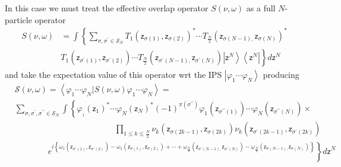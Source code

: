\documentclass[aps,preprint]{revtex4}%
\begin{document}
In this case we must treat the effective overlap operator $S\left(  \nu
,\omega\right)  $ as a full $N$-particle operator
\begin{align}
S\left(  \nu,\omega\right)   &  =\int\left\{
{\textstyle\sum\limits_{\sigma,\sigma^{\prime}\in\mathcal{S}_{N}}}
T_{1}\left(  \mathsf{z}_{\sigma\left(  1\right)  },\mathsf{z}_{\sigma\left(
2\right)  }\right)  ^{\ast}\cdots T_{\frac{N}{2}}\left(  \mathsf{z}%
_{\sigma\left(  N-1\right)  ,}\mathsf{z}_{\sigma\left(  N\right)  }\right)
^{\ast}\right. \nonumber\\
&  \left.  T_{1}\left(  \mathsf{z}_{\sigma^{\prime}\left(  1\right)
},\mathsf{z}_{\sigma^{\prime}\left(  2\right)  }\right)  \cdots T_{\frac{N}%
{2}}\left(  \mathsf{z}_{\sigma^{\prime}\left(  N-1\right)  ,}\mathsf{z}%
_{\sigma^{\prime}\left(  N\right)  }\right)  \left\vert \mathsf{z}%
^{N}\right\rangle \left\langle \mathsf{z}^{N}\right\vert \right\}
d\mathsf{z}^{N}%
\end{align}
and take the expectation value of this operator wrt the IPS $\left\vert
\varphi_{1}\cdots\varphi_{N}\right\rangle $ producing
\begin{align}
&  \mathcal{S}\left(  \nu,\omega\right)  =\left\langle \varphi_{1}%
\cdots\varphi_{N}|S\left(  \nu,\omega\right)  \varphi_{1}\cdots\varphi
_{N}\right\rangle =\nonumber\\
&
{\textstyle\sum\limits_{\sigma,\sigma^{\prime},\sigma^{\prime\prime}%
\in\mathcal{S}_{N}}}
{\displaystyle\int}
\left\{  \varphi_{_{1}}\left(  \mathsf{z}_{1}\right)  ^{\ast}\cdots\varphi
_{N}\left(  \mathsf{z}_{N}\right)  ^{\ast}\left(  -1\right)  ^{\pi\left(
\sigma^{\prime\prime}\right)  }\varphi_{1}\left(  \mathsf{z}_{\sigma
^{\prime\prime}\left(  1\right)  }\right)  \cdots\varphi_{N}\left(
\mathsf{z}_{\sigma^{\prime\prime}\left(  N\right)  }\right)  \right.
\times\nonumber\\
&  \qquad\qquad\qquad\qquad\qquad\qquad%
{\displaystyle\prod\limits_{1\leq k\leq\frac{N}{2}}}
\nu_{k}\left(  \mathsf{z}_{\sigma\left(  2k-1\right)  },\mathsf{z}%
_{\sigma\left(  2k\right)  }\right)  \nu_{k}\left(  \mathsf{z}_{\sigma
^{\prime}\left(  2k-1\right)  },\mathsf{z}_{\sigma^{\prime}\left(  2k\right)
}\right) \nonumber\\
&  \qquad\qquad\left.  e^{i\left\{  \omega_{1}\left(  \mathsf{z}%
_{\sigma^{\prime}\left(  1\right)  },\mathsf{z}_{\sigma^{\prime}\left(
2\right)  }\right)  -\omega_{1}\left(  \mathsf{z}_{\sigma\left(  1\right)
},\mathsf{z}_{\sigma\left(  2\right)  }\right)  +\cdots+\omega_{\frac{N}{2}%
}\left(  \mathsf{z}_{\sigma^{\prime}\left(  N-1\right)  ,}\mathsf{z}%
_{\sigma^{\prime}\left(  N\right)  }\right)  -\omega_{\frac{N}{2}}\left(
\mathsf{z}_{\sigma\left(  N-1\right)  ,}\mathsf{z}_{\sigma\left(  N\right)
}\right)  \right\}  }\right\}  d\mathsf{z}^{N}%
\end{align}
\end{document}
